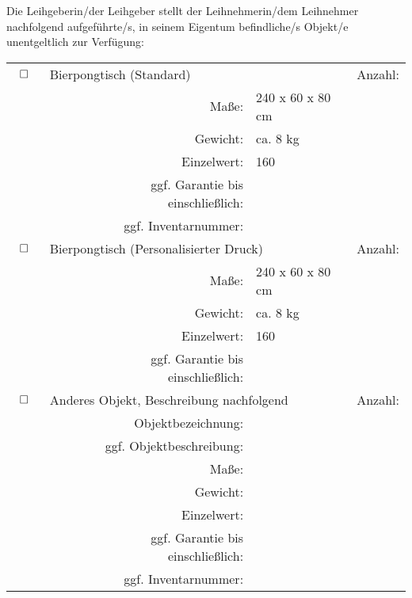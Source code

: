 \documentclass[article, 11pt,a4paper, titlepage, parskip=half, bibliography=totocnumbered]{scrreprt}
\begin{document}
	\begin{contract}
		
		\parnumberfalse
		Die Leihgeberin/der Leihgeber stellt der Leihnehmerin/dem Leihnehmer nachfolgend aufgeführte/s, in seinem Eigentum befindliche/s Objekt/e unentgeltlich zur Verfügung:
			
		\begin{table}[htbp]
			\begin{tabular}{rrlr}
				\multicolumn{1}{l}{$\makebox[20pt][L]{$\square$}\raisebox{.15ex}{\hspace{0.1em}}$} & \multicolumn{2}{l}{Bierpongtisch (Standard)} & \multicolumn{1}{l}{Anzahl:} \\
				&       Maße: 				& 240 x 60 x 80 cm & \\
				&       Gewicht:			& ca. 8 kg 	& \\
				&       Einzelwert: 		& 160 \EUR 	& \\
				&       ~~~~ ggf. Garantie bis einschließlich:	& & \\
				&       ggf. Inventarnummer: 				& & \\
				\multicolumn{1}{l}{$\makebox[20pt][L]{$\square$}\raisebox{.15ex}{\hspace{0.1em}}$} & \multicolumn{2}{l}{Bierpongtisch (Personalisierter Druck) ~~} & \multicolumn{1}{l}{Anzahl:} \\
								&       Maße: 				& 240 x 60 x 80 cm & \\
				&       Gewicht:			& ca. 8 kg 	& \\
				&       Einzelwert: 		& 160 \EUR 	& \\
				&       ~~~~ ggf. Garantie bis einschließlich:	& & \\
				\multicolumn{1}{l}{$\makebox[20pt][L]{$\square$}\raisebox{.15ex}{\hspace{0.1em}}$} & \multicolumn{2}{l}{Anderes Objekt, Beschreibung nachfolgend} & \multicolumn{1}{l}{Anzahl:} \\
				&       Objektbezeichnung: 					& &  \\
				&       ggf. Objektbeschreibung: 		& &  \\
				&       Maße: 								& & \\
				&       Gewicht: 							& & \\
				&       Einzelwert: 						& & \\
				&       ~~~~ ggf. Garantie bis einschließlich:	& & \\
				&       ggf. Inventarnummer: 				& & \\
			\end{tabular}%
		\end{table}%
		\parnumbertrue
		

\end{contract}
\end{document}
